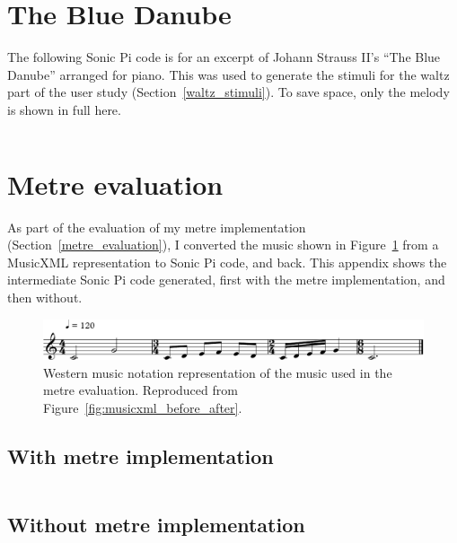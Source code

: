 \documentclass[12pt,twoside,openright]{report}
\begin{document}
\section*{The Blue Danube} \label{appendix_code_blue_danube}

The following Sonic Pi code is for an excerpt of Johann Strauss II's ``The Blue Danube'' arranged for piano. This was used to generate the stimuli for the waltz part of the user study (Section~\ref{waltz_stimuli}). To save space, only the melody is shown in full here.

\begin{multicols}{2}
    \inputminted[linenos=true]{ruby}{figures/blue_danube_code.rb}
\end{multicols}



\section*{Metre evaluation} \label{appendix_code_metre_evaluation}

As part of the evaluation of my metre implementation (Section~\ref{metre_evaluation}), I converted the music shown in Figure~\ref{fig:appendix_musicxml_before} from a MusicXML representation to Sonic Pi code, and back. This appendix shows the intermediate Sonic Pi code generated, first with the metre implementation, and then without.

\begin{figure}[ht]
    \centering
    \includegraphics[width=\linewidth]{figures/metre_eval_orig.pdf}
    \caption{Western music notation representation of the music used in the metre evaluation. Reproduced from Figure~\ref{fig:musicxml_before_after}.}
    \label{fig:appendix_musicxml_before}
\end{figure}


\subsection*{With metre implementation}

\inputminted[linenos=true]{ruby}{figures/metre_eval_code.rb}


\subsection*{Without metre implementation}

\begin{multicols}{2}
    \inputminted[linenos=true]{ruby}{figures/metre_eval_bad_code.rb}
\end{multicols}
\end{document}
